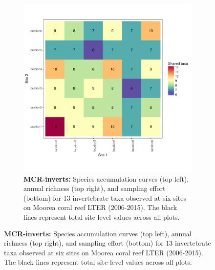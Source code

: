 \documentclass[11pt, oneside]{article}
\begin{document}
\begin{figure}[h!]
\begin{figure}[h!]
\includegraphics[scale = 0.4]{mcr-inverts-castorani_spp_shared.pdf}
\caption{{\bf MCR-inverts:} Species accumulation curves (top left),  annual richness (top right), and sampling effort (bottom)  for 13 invertebrate taxa observed at six sites on Moorea coral reef LTER (2006-2015). The black lines represent total site-level values across all plots.}
\label{mcr-inverts}
\end{figure}



\end{figure}
\end{document}
